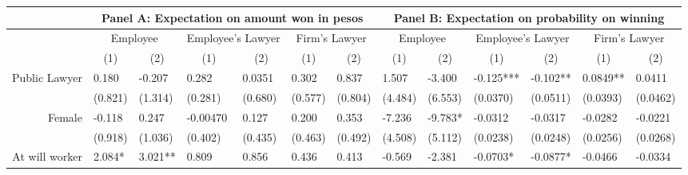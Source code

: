 \begin{tabular}{rrrrrrrrrrrrr}
\toprule
      & \multicolumn{6}{c}{Panel A: Expectation on amount won in pesos} & \multicolumn{6}{c}{Panel B: Expectation on probability on winning} \\
\midrule
      & \multicolumn{2}{c}{Employee} & \multicolumn{2}{c}{Employee's Lawyer } & \multicolumn{2}{c}{Firm's Lawyer } & \multicolumn{2}{c}{Employee} & \multicolumn{2}{c}{Employee's Lawyer } & \multicolumn{2}{c}{Firm's Lawyer } \\
      & \multicolumn{1}{c}{(1)} & \multicolumn{1}{c}{(2)} & \multicolumn{1}{c}{(1)} & \multicolumn{1}{c}{(2)} & \multicolumn{1}{c}{(1)} & \multicolumn{1}{c}{(2)} & \multicolumn{1}{c}{(1)} & \multicolumn{1}{c}{(2)} & \multicolumn{1}{c}{(1)} & \multicolumn{1}{c}{(2)} & \multicolumn{1}{c}{(1)} & \multicolumn{1}{c}{(2)} \\
Public Lawyer & \multicolumn{1}{l}{0.180} & \multicolumn{1}{l}{-0.207} & \multicolumn{1}{l}{0.282} & \multicolumn{1}{l}{0.0351} & \multicolumn{1}{l}{0.302} & \multicolumn{1}{l}{0.837} & \multicolumn{1}{l}{1.507} & \multicolumn{1}{l}{-3.400} & \multicolumn{1}{l}{-0.125***} & \multicolumn{1}{l}{-0.102**} & \multicolumn{1}{l}{0.0849**} & \multicolumn{1}{l}{0.0411} \\
      & \multicolumn{1}{l}{(0.821)} & \multicolumn{1}{l}{(1.314)} & \multicolumn{1}{l}{(0.281)} & \multicolumn{1}{l}{(0.680)} & \multicolumn{1}{l}{(0.577)} & \multicolumn{1}{l}{(0.804)} & \multicolumn{1}{l}{(4.484)} & \multicolumn{1}{l}{(6.553)} & \multicolumn{1}{l}{(0.0370)} & \multicolumn{1}{l}{(0.0511)} & \multicolumn{1}{l}{(0.0393)} & \multicolumn{1}{l}{(0.0462)} \\
Female & \multicolumn{1}{l}{-0.118} & \multicolumn{1}{l}{0.247} & \multicolumn{1}{l}{-0.00470} & \multicolumn{1}{l}{0.127} & \multicolumn{1}{l}{0.200} & \multicolumn{1}{l}{0.353} & \multicolumn{1}{l}{-7.236} & \multicolumn{1}{l}{-9.783*} & \multicolumn{1}{l}{-0.0312} & \multicolumn{1}{l}{-0.0317} & \multicolumn{1}{l}{-0.0282} & \multicolumn{1}{l}{-0.0221} \\
      & \multicolumn{1}{l}{(0.918)} & \multicolumn{1}{l}{(1.036)} & \multicolumn{1}{l}{(0.402)} & \multicolumn{1}{l}{(0.435)} & \multicolumn{1}{l}{(0.463)} & \multicolumn{1}{l}{(0.492)} & \multicolumn{1}{l}{(4.508)} & \multicolumn{1}{l}{(5.112)} & \multicolumn{1}{l}{(0.0238)} & \multicolumn{1}{l}{(0.0248)} & \multicolumn{1}{l}{(0.0256)} & \multicolumn{1}{l}{(0.0268)} \\
At will worker & \multicolumn{1}{l}{2.084*} & \multicolumn{1}{l}{3.021**} & \multicolumn{1}{l}{0.809} & \multicolumn{1}{l}{0.856} & \multicolumn{1}{l}{0.436} & \multicolumn{1}{l}{0.413} & \multicolumn{1}{l}{-0.569} & \multicolumn{1}{l}{-2.381} & \multicolumn{1}{l}{-0.0703*} & \multicolumn{1}{l}{-0.0877*} & \multicolumn{1}{l}{-0.0466} & \multicolumn{1}{l}{-0.0334} \\

\end{tabular}
